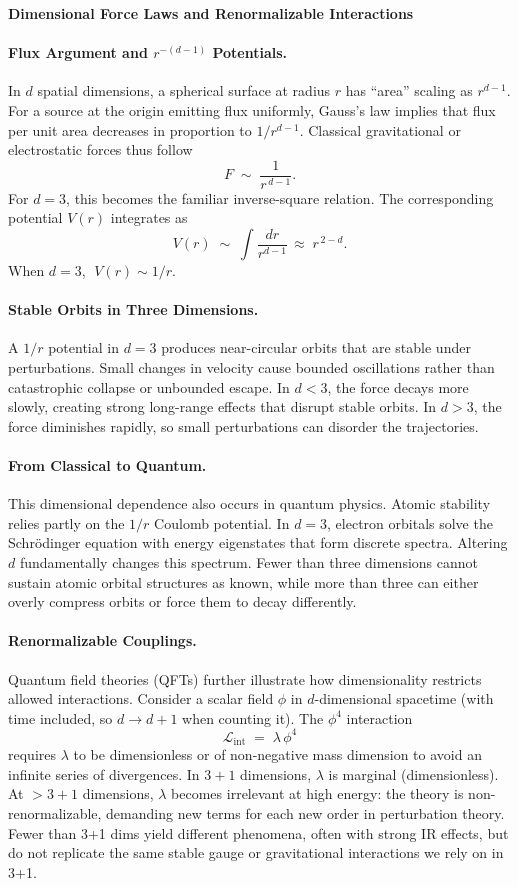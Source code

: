 \begin{technical}
{\Large \textbf{Dimensional Force Laws and Renormalizable Interactions}}

\paragraph{Flux Argument and $r^{-(d-1)}$ Potentials.}
In $d$ spatial dimensions, a spherical surface at radius $r$ has ``area'' scaling as $r^{d-1}$. For a source at the origin emitting flux uniformly, Gauss's law implies that flux per unit area decreases in proportion to $1/r^{d-1}$. Classical gravitational or electrostatic forces thus follow 
$$
F \;\sim\; \frac{1}{r^{\,d-1}}.
$$
For $d=3$, this becomes the familiar inverse-square relation. The corresponding potential $V(r)$ integrates as
$$
V(r) \;\sim\; \int \frac{dr}{r^{d-1}} \,\approx\; r^{\,2-d}.
$$
When $d=3$, $\;V(r)\sim 1/r$.

\paragraph{Stable Orbits in Three Dimensions.}
A $1/r$ potential in $d=3$ produces near-circular orbits that are stable under perturbations. Small changes in velocity cause bounded oscillations rather than catastrophic collapse or unbounded escape. In $d<3$, the force decays more slowly, creating strong long-range effects that disrupt stable orbits. In $d>3$, the force diminishes rapidly, so small perturbations can disorder the trajectories.

\paragraph{From Classical to Quantum.}
This dimensional dependence also occurs in quantum physics. Atomic stability relies partly on the $1/r$ Coulomb potential. In $d=3$, electron orbitals solve the Schrödinger equation with energy eigenstates that form discrete spectra. Altering $d$ fundamentally changes this spectrum. Fewer than three dimensions cannot sustain atomic orbital structures as known, while more than three can either overly compress orbits or force them to decay differently.

\paragraph{Renormalizable Couplings.}
Quantum field theories (QFTs) further illustrate how dimensionality restricts allowed interactions. Consider a scalar field $\phi$ in $d$-dimensional spacetime (with time included, so $d\rightarrow d+1$ when counting it). The $\phi^4$ interaction 
$$
\mathcal{L}_{\mathrm{int}} \;=\; \lambda\,\phi^4
$$
requires $\lambda$ to be dimensionless or of non-negative mass dimension to avoid an infinite series of divergences. In $3+1$ dimensions, $\lambda$ is marginal (dimensionless). At $>3+1$ dimensions, $\lambda$ becomes irrelevant at high energy: the theory is non-renormalizable, demanding new terms for each new order in perturbation theory. Fewer than 3+1 dims yield different phenomena, often with strong IR effects, but do not replicate the same stable gauge or gravitational interactions we rely on in 3+1.


\end{technical}
